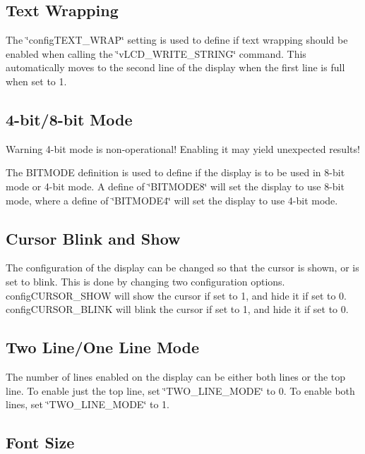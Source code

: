  \hypertarget{_usage_wrap}{}\subsection{Text Wrapping}\label{_usage_wrap}
The \char`\"{}config\-T\-E\-X\-T\-\_\-\-W\-R\-A\-P\char`\"{} setting is used to define if text wrapping should be enabled when calling the \char`\"{}v\-L\-C\-D\-\_\-\-W\-R\-I\-T\-E\-\_\-\-S\-T\-R\-I\-N\-G\char`\"{} command. This automatically moves to the second line of the display when the first line is full when set to 1.\hypertarget{_usage_bitmode}{}\subsection{4-\/bit/8-\/bit Mode}\label{_usage_bitmode}
\begin{DoxyWarning}{Warning}
4-\/bit mode is non-\/operational! Enabling it may yield unexpected results!
\end{DoxyWarning}
The B\-I\-T\-M\-O\-D\-E definition is used to define if the display is to be used in 8-\/bit mode or 4-\/bit mode. A define of \char`\"{}\-B\-I\-T\-M\-O\-D\-E8\char`\"{} will set the display to use 8-\/bit mode, where a define of \char`\"{}\-B\-I\-T\-M\-O\-D\-E4\char`\"{} will set the display to use 4-\/bit mode.\hypertarget{_usage_Cursor}{}\subsection{Cursor Blink and Show}\label{_usage_Cursor}
The configuration of the display can be changed so that the cursor is shown, or is set to blink. This is done by changing two configuration options. config\-C\-U\-R\-S\-O\-R\-\_\-\-S\-H\-O\-W will show the cursor if set to 1, and hide it if set to 0. config\-C\-U\-R\-S\-O\-R\-\_\-\-B\-L\-I\-N\-K will blink the cursor if set to 1, and hide it if set to 0.\hypertarget{_usage_twoline}{}\subsection{Two Line/\-One Line Mode}\label{_usage_twoline}
The number of lines enabled on the display can be either both lines or the top line. To enable just the top line, set \char`\"{}\-T\-W\-O\-\_\-\-L\-I\-N\-E\-\_\-\-M\-O\-D\-E\char`\"{} to 0. To enable both lines, set \char`\"{}\-T\-W\-O\-\_\-\-L\-I\-N\-E\-\_\-\-M\-O\-D\-E\char`\"{} to 1.\hypertarget{_usage_font}{}\subsection{Font Size}\label{_usage_font}
